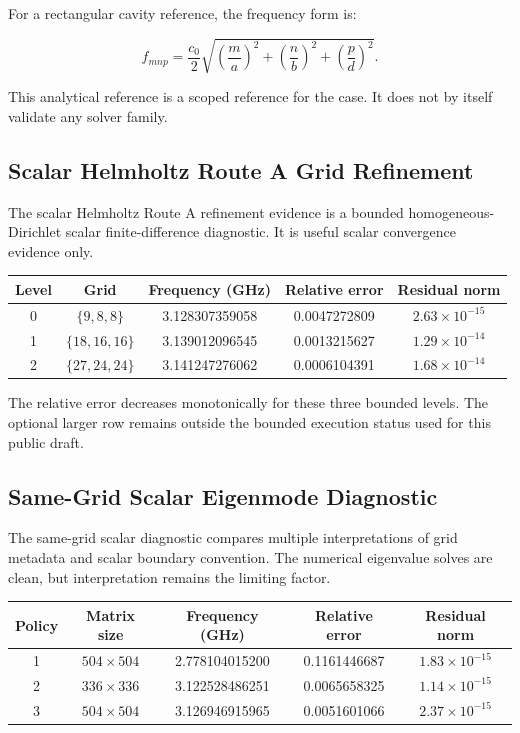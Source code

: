 \documentclass[11pt,a4paper]{article}
\begin{document}
For a rectangular cavity reference, the frequency form is:

\[
f_{mnp} = \frac{c_0}{2}\sqrt{\left(\frac{m}{a}\right)^2+\left(\frac{n}{b}\right)^2+\left(\frac{p}{d}\right)^2}.
\]

This analytical reference is a scoped reference for the case. It does not by itself validate any solver family.

\subsection{Scalar Helmholtz Route A Grid Refinement}

The scalar Helmholtz Route A refinement evidence is a bounded homogeneous-Dirichlet scalar finite-difference diagnostic. It is useful scalar convergence evidence only.

\begin{longtable}{ccccc}
\toprule
\textbf{Level} & \textbf{Grid} & \textbf{Frequency (GHz)} & \textbf{Relative error} & \textbf{Residual norm}\\
\midrule
\endhead
0 & \(\{9,8,8\}\) & 3.128307359058 & 0.0047272809 & \(2.63\times 10^{-15}\)\\
1 & \(\{18,16,16\}\) & 3.139012096545 & 0.0013215627 & \(1.29\times 10^{-14}\)\\
2 & \(\{27,24,24\}\) & 3.141247276062 & 0.0006104391 & \(1.68\times 10^{-14}\)\\
\bottomrule
\end{longtable}

The relative error decreases monotonically for these three bounded levels. The optional larger row remains outside the bounded execution status used for this public draft.

\subsection{Same-Grid Scalar Eigenmode Diagnostic}

The same-grid scalar diagnostic compares multiple interpretations of grid metadata and scalar boundary convention. The numerical eigenvalue solves are clean, but interpretation remains the limiting factor.

\begin{longtable}{ccccc}
\toprule
\textbf{Policy} & \textbf{Matrix size} & \textbf{Frequency (GHz)} & \textbf{Relative error} & \textbf{Residual norm}\\
\midrule
\endhead
1 & \(504\times 504\) & 2.778104015200 & 0.1161446687 & \(1.83\times 10^{-15}\)\\
2 & \(336\times 336\) & 3.122528486251 & 0.0065658325 & \(1.14\times 10^{-15}\)\\
3 & \(504\times 504\) & 3.126946915965 & 0.0051601066 & \(2.37\times 10^{-15}\)\\
\bottomrule
\end{longtable}
\end{document}
